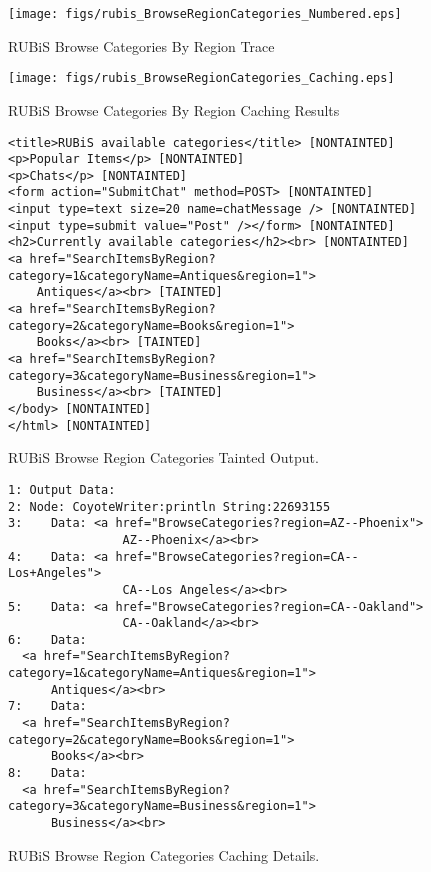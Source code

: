 \documentclass[msc,oneside]{ubcthesis}
\begin{document}
\begin{sidewaysfigure}
\centering
\scalebox{0.43}
{\texttt{[image: figs/rubis\_BrowseRegionCategories\_Numbered.eps]}}
\caption{RUBiS Browse Categories By Region Trace} 
\label{fig:browseregioncategories}
\end{sidewaysfigure}

\begin{sidewaysfigure}
\centering
\scalebox{0.41}
{\texttt{[image: figs/rubis\_BrowseRegionCategories\_Caching.eps]}}
\caption{RUBiS Browse Categories By Region Caching Results} 
\label{fig:browseregioncategoriescaching}
\end{sidewaysfigure}

\begin{figure}[ht]
  \caption{\label{fig:browseregioncategoriesto} RUBiS Browse Region Categories Tainted Output.}
\begin{verbatim}
<title>RUBiS available categories</title> [NONTAINTED]
<p>Popular Items</p> [NONTAINTED]
<p>Chats</p> [NONTAINTED]
<form action="SubmitChat" method=POST> [NONTAINTED]
<input type=text size=20 name=chatMessage /> [NONTAINTED]
<input type=submit value="Post" /></form> [NONTAINTED]
<h2>Currently available categories</h2><br> [NONTAINTED]
<a href="SearchItemsByRegion?category=1&categoryName=Antiques&region=1">
    Antiques</a><br> [TAINTED]
<a href="SearchItemsByRegion?category=2&categoryName=Books&region=1">
    Books</a><br> [TAINTED]
<a href="SearchItemsByRegion?category=3&categoryName=Business&region=1">
    Business</a><br> [TAINTED]
</body> [NONTAINTED]
</html> [NONTAINTED]
\end{verbatim}
\end{figure}

\begin{figure}[ht]
  \caption{\label{fig:browseregioncategoriescd} RUBiS Browse Region Categories Caching Details.}
\begin{verbatim}
1: Output Data:
2: Node: CoyoteWriter:println String:22693155
3:    Data: <a href="BrowseCategories?region=AZ--Phoenix">
                AZ--Phoenix</a><br>
4:    Data: <a href="BrowseCategories?region=CA--Los+Angeles">
                CA--Los Angeles</a><br>
5:    Data: <a href="BrowseCategories?region=CA--Oakland">
                CA--Oakland</a><br>
6:    Data: 
  <a href="SearchItemsByRegion?category=1&categoryName=Antiques&region=1">
      Antiques</a><br>
7:    Data: 
  <a href="SearchItemsByRegion?category=2&categoryName=Books&region=1">
      Books</a><br>
8:    Data: 
  <a href="SearchItemsByRegion?category=3&categoryName=Business&region=1">
      Business</a><br>
\end{verbatim}
\end{figure}
\end{document}
